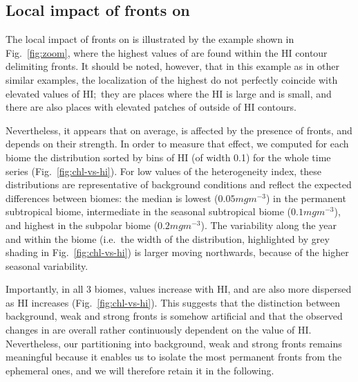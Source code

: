 \subsection{Local impact of fronts on }

The local impact of fronts on  is illustrated by the example shown in Fig.~\ref{fig:zoom}, where the highest values of  are found within the HI contour delimiting fronts.
It should be noted, however, that in this example as in other similar examples, the localization of the highest  do not perfectly coincide with elevated values of HI;\ they are places where the HI is large and  is small, and there are also places with elevated patches of  outside of HI contours.

Nevertheless, it appears that on average,  is affected by the presence of fronts, and depends on their strength.
In order to measure that effect, we computed for each biome the  distribution sorted by bins of HI (of width 0.1) for the whole time series (Fig.~\ref{fig:chl-vs-hi}).
For low values of the heterogeneity index, these distributions are representative of background conditions and reflect the expected differences between biomes: the median  is lowest (\(0.05 mg m^{-3}\)) in the permanent subtropical biome, intermediate in the seasonal subtropical biome (\(0.1 mg m^{-3}\)), and highest in the subpolar biome (\(0.2 mg m^{-3}\)).
The  variability along the year and within the biome (i.e.\ the width of the distribution, highlighted by grey shading in Fig.~\ref{fig:chl-vs-hi}) is larger moving northwards, because of the higher seasonal variability.

Importantly, in all 3 biomes,  values increase with HI, and are also more dispersed as HI increases (Fig.~\ref{fig:chl-vs-hi}).
This suggests that the distinction between background, weak and strong fronts is somehow artificial and that the observed changes in  are overall rather continuously dependent on the value of HI.\@
Nevertheless, our partitioning into background, weak and strong fronts remains meaningful because it enables us to isolate the most permanent fronts from the ephemeral ones, and we will therefore retain it in the following.


